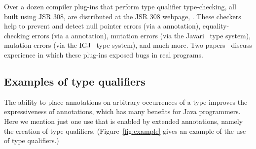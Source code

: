\documentclass[10pt]{article}
\begin{document}
Over a dozen compiler plug-ins that perform type qualifier type-checking, all built
using JSR 308, are distributed at the JSR 308 webpage,
.  These checkers
help to prevent and detect null pointer errors (via a 
annotation), equality-checking errors (via a  annotation),
mutation errors (via the Javari~\cite{BirkaE2004,TschantzE2005} type
system), mutation errors (via the IGJ~\cite{ZibinPAAKE2007} type
system), and much more.  Two papers~\cite{PapiACPE2008,DietlDEMS2011} discuss experience
in which these plug-ins exposed bugs in real programs.


\subsection{Examples of type qualifiers\label{type-qualifier-examples}}

The ability to place annotations on arbitrary occurrences of a type
improves the expressiveness of annotations, which has many benefits for
Java programmers.  Here we mention just one use that is enabled by extended
annotations, namely the creation of type qualifiers.
(Figure~\ref{fig:example} gives an example of the use of type qualifiers.)
\end{document}

